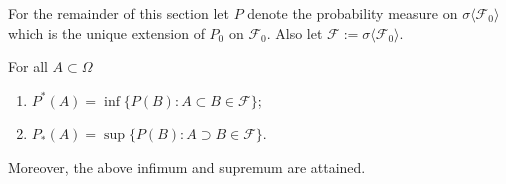 \begin{sectionassumption}
\label{outer2}
For the remainder of this section let $P$ denote the probability measure  on $\sigma\langle \mathcal F_0\rangle$ which is the unique extension of  $P_0$ on $\mathcal F_0$. Also let $\mathcal F:=\sigma\langle \mathcal F_0\rangle$.
\end{sectionassumption}

\begin{theorem}
\label{thm: Easier formula for $P^*$}
For all $A\subset\Omega$
\begin{enumerate}
\item\label{item1: Easier formula for $P^*$} $P^*(A)=\inf\{ P(B): A\subset B\in   \mathcal F \}$;
\item\label{item2: Easier formula for $P^*$} $P_*(A)=\sup\{ P(B): A\supset B\in  \mathcal F \}$.
\end{enumerate}
Moreover, the above infimum and supremum are attained.
\end{theorem}
